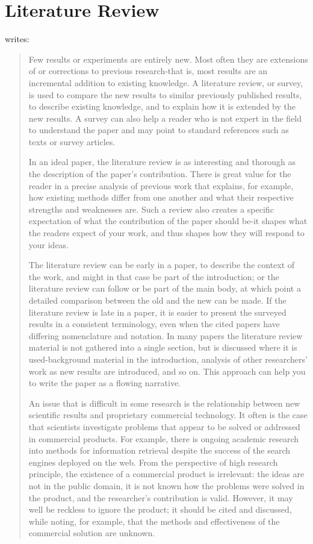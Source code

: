 \documentclass[a4paper,oneside,bibliography=totoc]{scrartcl}
\begin{document}
\section{Literature Review}
\label{sec:related_work}

\citet{zobel2004} writes:

\blockcquote{zobel2004}{%
  Few results or experiments are entirely new. Most often they are extensions of
  or corrections to previous research-that is, most results are an incremental
  addition to existing knowledge. A literature review, or survey, is used to
  compare the new results to similar previously published results, to describe
  existing knowledge, and to explain how it is extended by the new results. A
  survey can also help a reader who is not expert in the field to understand the
  paper and may point to standard references such as texts or survey articles.

  In an ideal paper, the literature review is as interesting and thorough as the
  description of the paper's contribution. There is great value for the reader
  in a precise analysis of previous work that explains, for example, how
  existing methods differ from one another and what their respective strengths
  and weaknesses are. Such a review also creates a specific expectation of what
  the contribution of the paper should be-it shapes what the readers expect of
  your work, and thus shapes how they will respond to your ideas.

  The literature review can be early in a paper, to describe the context of the
  work, and might in that case be part of the introduction; or the literature
  review can follow or be part of the main body, at which point a detailed
  comparison between the old and the new can be made. If the literature review
  is late in a paper, it is easier to present the surveyed results in a
  consistent terminology, even when the cited papers have differing nomenclature
  and notation. In many papers the literature review material is not gathered
  into a single section, but is discussed where it is used-background material
  in the introduction, analysis of other researchers' work as new results are
  introduced, and so on. This approach can help you to write the paper as a
  flowing narrative.

  An issue that is difficult in some research is the relationship between new
  scientific results and proprietary commercial technology. It often is the case
  that scientists investigate problems that appear to be solved or addressed in
  commercial products. For example, there is ongoing academic research into
  methods for information retrieval despite the success of the search engines
  deployed on the web. From the perspective of high research principle, the
  existence of a commercial product is irrelevant: the ideas are not in the
  public domain, it is not known how the problems were solved in the product,
  and the researcher's contribution is valid. However, it may well be reckless
  to ignore the product; it should be cited and discussed, while noting, for
  example, that the methods and effectiveness of the commercial solution are
  unknown. }
\end{document}
